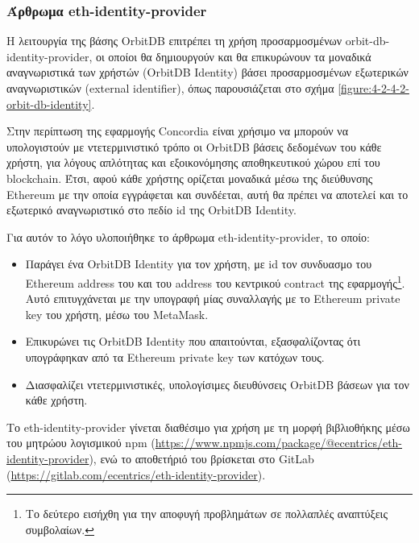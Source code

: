 \subsubsection{Άρθρωμα eth-identity-provider} \label{subsubsection:4-3-1-eth-identity-provider-unit}

Η λειτουργία της βάσης OrbitDB επιτρέπει τη χρήση προσαρμοσμένων  orbit-db-identity-provider, οι οποίοι θα δημιουργούν και θα επικυρώνουν
τα μοναδικά αναγνωριστικά των χρήστών (OrbitDB Identity) βάσει προσαρμοσμένων εξωτερικών αναγνωριστικών (external identifier), όπως παρουσιάζεται στο σχήμα \ref{figure:4-2-4-2-orbit-db-identity}. 

Στην περίπτωση της εφαρμογής Concordia είναι χρήσιμο να μπορούν να υπολογιστούν με ντετερμινιστικό τρόπο οι OrbitDB βάσεις δεδομένων του κάθε χρήστη, για λόγους απλότητας και εξοικονόμησης αποθηκευτικού χώρου επί του blockchain. Έτσι, αφού κάθε χρήστης ορίζεται μοναδικά μέσω της διεύθυνσης Ethereum με την οποία εγγράφεται και συνδέεται, αυτή θα πρέπει να αποτελεί και το εξωτερικό αναγνωριστικό στο πεδίο id της OrbitDB Identity.

Για αυτόν το λόγο υλοποιήθηκε το άρθρωμα eth-identity-provider, το οποίο:

\begin{itemize}
	\item Παράγει ένα OrbitDB Identity για τον χρήστη, με id τον συνδυασμο του Ethereum address του και του address του κεντρικού contract της εφαρμογής\footnote{Το δεύτερο εισήχθη για την αποφυγή προβλημάτων σε πολλαπλές αναπτύξεις συμβολαίων.}. Αυτό επιτυγχάνεται με την υπογραφή μίας συναλλαγής με το Ethereum private key του χρήστη, μέσω του MetaMask.
	\item Επικυρώνει τις OrbitDB Identity που απαιτούνται, εξασφαλίζοντας ότι υπογράφηκαν από τα Ethereum private key των κατόχων τους. 
	\item Διασφαλίζει ντετερμινιστικές, υπολογίσιμες διευθύνσεις OrbitDB βάσεων για τον κάθε χρήστη.
\end{itemize}

Το eth-identity-provider γίνεται διαθέσιμο για χρήση με τη μορφή βιβλιοθήκης μέσω του μητρώου λογισμικού npm (\url{https://www.npmjs.com/package/@ecentrics/eth-identity-provider}), ενώ το αποθετήριό του βρίσκεται στο GitLab (\url{https://gitlab.com/ecentrics/eth-identity-provider}).
